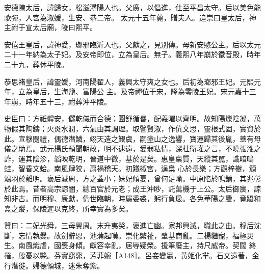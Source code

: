 \begin{pinyinscope}
 安德陳太后，諱歸女，松滋潯陽人也。父廣，以倡進，仕至平昌太守。后以美色能歌彈，入宮為淑媛，生安、恭二帝。
 太元十五年薨，贈夫人。追崇曰皇太后，神主祔于宣太后廟，陵曰熙平。



 安僖王皇后，諱神愛，瑯邪臨沂人也。父獻之，見別傳。母新安愍公主。后以太元二十一年納為太子妃。及安帝即位，立為皇后。無子。義熙八年崩於徽音殿，時年二十九，葬休平陵。



 恭思褚皇后，諱靈媛，河南陽翟人，義興太守爽之女也。后初為瑯邪王妃。元熙元年，立為皇后，生海鹽、富陽公
 主。及帝禪位于宋，降為零陵王妃。宋元嘉十三年崩，時年五十三，祔葬沖平陵。



 史臣曰：方祇體安，儷乾儀而合德；圓舒循晷，配羲曜以齊明。故知陽爍陰凝，萬物假其陶鑄；火炎水潤，六氣由其調理。取譬賢淑，作伉文思，靈根式固，實資於此。宣穆閱禮，偶德潛鱗，翊天造之艱虞，嗣塗山之逸響，寶運歸其後胤，蓋有母儀之助焉。武元楊氏預聞朝政，明不逮遠，愛弱私情，深杜衛瓘之言，不曉張泓之詐，運其陰沴，韜映乾明，晉道中微，基於是矣。惠皇稟質，天縱其嚚，識暗鳴蛙，智昏文蛤。南風肆狡，扇禍稽天。初踐椒宮，逞梟
 心於長樂；方觀梓樹，頒鴆羽於離明。褒后滅周，方之蓋小；妹妃傾夏，曾何足喻。中原陷於鳴鏑，其兆彰於此焉。昔者高宗諒闇，總百官於元老；成王沖眇，託萬機于上公。太后御宸，諒知非古。而明穆、康獻，仍世臨朝，時屬委裘，躬行負扆。各免華陽之釁，竟躡和熹之蹤，保陵遲以克終，所幸實為多矣。



 贊曰：二妃光舜，三母翼周。末升夷癸，褒進亡幽。家邦興滅，職此之由。穆后沈斷，忘情執爨。故劍辭恩，池蒲起嘆。崇化繁祉，肇基商亂。二楊繼寵，福極災生。南風熾虐，國喪身傾。獻容幸亂，居辱疑榮。援筆廢主，持尺威帝。契闊
 終罹，殷憂以斃。芬實窈窕，芳菲婉［A148］。呂妾變嬴，黃姬化羋。石文遠著，金行潛徙。婦德傾城，迷朱奪紫。



\end{pinyinscope}